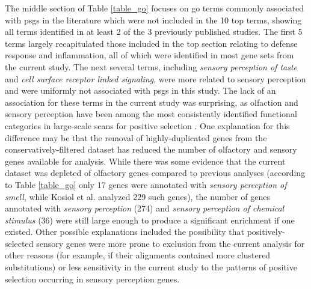 The middle section of Table \ref{table_go} focuses on \ac{go} terms
commonly associated with \acp{psg} in the literature which were not
included in the 10 top terms, showing all terms identified in at least
2 of the 3 previously published studies. The first 5 terms largely
recapitulated those included in the top section relating to defense
response and inflammation, all of which were identified in most gene
sets from the current study. The next several terms, including
\emph{sensory perception of taste} and \emph{cell surface receptor
  linked signaling}, were more related to sensory perception and were
uniformly not associated with \acp{psg} in this study. The lack of an
association for these terms in the current study was surprising, as
olfaction and sensory perception have been among the most consistently
identified functional categories in large-scale scans for positive
selection \citep{Nielsen2005,Nielsen2005b}. One explanation for this
difference may be that the removal of highly-duplicated genes from the
conservatively-filtered dataset has reduced the number of olfactory
and sensory genes available for analysis. While there was some
evidence that the current dataset was depleted of olfactory genes
compared to previous analyses (according to Table \ref{table_go} only
17 genes were annotated with \emph{sensory perception of smell}, while
Kosiol et al. \citeyearpar{2008} analyzed 229 such genes), the number
of genes annotated with \emph{sensory perception} (274) and
\emph{sensory perception of chemical stimulus} (36) were still large
enough to produce a significant enrichment if one existed. Other
possible explanations included the possibility that
positively-selected sensory genes were more prone to exclusion from
the current analysis for other reasons (for example, if their
alignments contained more clustered \nsyn substitutions) or less
sensitivity in the current study to the patterns of positive selection
occurring in sensory perception genes.

